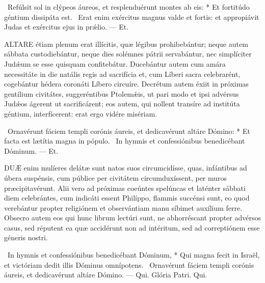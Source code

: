 \R\ Refúlsit sol in clýpeos áureos, et resplenduérunt montes ab eis: * Et fortitúdo géntium dissipáta est. \V\ Erat enim exércitus magnus valde et fortis: et appropiávit Judas et exércitus ejus in prǽlio. — Et.


\lettrine[lines=2]{A}{LTARE} étiam plenum erat illícitis, quæ légibus prohibebántur; neque autem sábbata custodiebántur, neque dies solémnes pátrii servabántur, nec simplíciter Judǽum se esse quisquam confitebátur. Ducebántur autem cum amára necessitáte in die natális regis ad sacrifícia et, cum Líberi sacra celebrarént, cogebántur hédera coronáti Líbero circuíre. Decrétum autem éxiit in próximas gentílium civitátes, suggeréntibus Ptolemǽis, ut pari modo et ipsi advérsus Judǽos ágerent ut sacrificárent; eos autem, qui nollent transíre ad institúta géntium, interfícerent: erat ergo vidére misériam.

\R\ Ornavérunt fáciem templi corónis áureis, et dedicavérunt altáre Dómino: * Et facta est lætítia magna in pópulo. \V\ In hymnis et confessiónibus benedicébant Dóminum. — Et.



\lettrine[lines=2]{D}{UÆ} enim mulíeres delátæ sunt natos suos circumcidísse, quas, infántibus ad úbera suspénsis, cum públice per civitátem circumduxíssent, per muros præcipitavérunt. Alii vero ad próximas coeúntes spelúncas et laténter sábbati diem celebrántes, cum indicáti essent Philíppo, flammis succénsi sunt, eo quod verebántur propter religiónem et observántiam manu síbimet auxílium ferre. Obsecro autem eos qui hunc librum lectúri sunt, ne abhorréscant propter advérsos casus, sed réputent ea quæ accidérunt non ad intéritum, sed ad correptiónem esse géneris nostri.

\R\ In hymnis et confessiónibus benedicébant Dóminum, * Qui magna fecit in Israël, et victóriam dedit illis Dóminus omnípotens. \V\ Ornavérunt fáciem templi corónis áureis, et dedicavérunt altáre Dómino. — Qui. Glória Patri. Qui.




